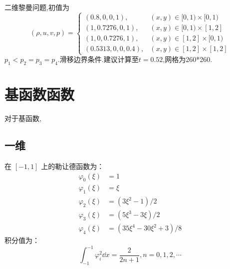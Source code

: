 \documentclass{book}
\begin{document}
\begin{example}{}{}
    二维黎曼问题\cite{RN13},初值为
    \begin{equation}
        (\rho, u, v, p)=\begin{cases}
            (0.8,0,0,1),      & (x, y) \in[0,1) \times[0,1) \\
            (1,0.7276,0,1),   & (x, y) \in[0,1) \times[1,2] \\
            (1,0,0.7276,1),   & (x, y) \in[1,2] \times[0,1) \\
            (0.5313,0,0,0.4), & (x, y) \in[1,2] \times[1,2]
        \end{cases}
    \end{equation}
    $p_1<p_2=p_3=p_4$.滑移边界条件.建议计算至$t=0.52$,网格为260*260.



\end{example}


\newpage
\section{基函数函数}
对于基函数,
\cite{RN48}
\subsection{一维}
在 $[-1,1]$ 上的勒让德函数为：
\begin{equation}
    \begin{aligned}
        \varphi_{0}(\xi) & =1                                        \\
        \varphi_{1}(\xi) & =\xi                                      \\
        \varphi_{2}(\xi) & =\left(3 \xi^{2}-1\right) / 2             \\
        \varphi_{3}(\xi) & =\left(5 \xi^{3}-3 \xi\right) / 2         \\
        \varphi_{4}(\xi) & =\left(35 \xi^{4}-30 \xi^{2}+3\right) / 8
    \end{aligned}
\end{equation}
积分值为：
\begin{equation}
    \int_{-1}^{-1}\varphi_i^2\dd x=\frac{2}{2n+1},n=0,1,2,\cdots
\end{equation}
\end{document}
